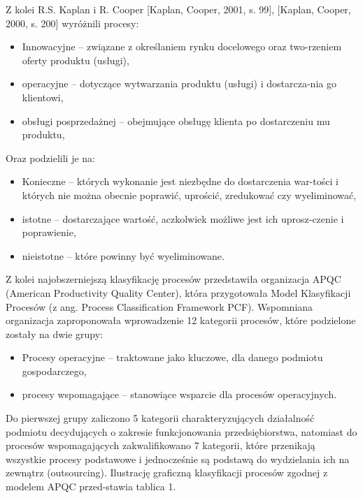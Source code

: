 \documentclass[a4paper, 12pt]{article}
\begin{document}
\hspace*{1.5 cm} Z  kolei  R.S.  Kaplan  i  R.  Cooper  [Kaplan,  Cooper,  2001, s.  99],  [Kaplan, Cooper, 2000, s. 200] wyróżnili procesy:
\begin{itemize}
	\item Innowacyjne – związane z określaniem rynku docelowego oraz two-rzeniem oferty produktu (usługi), 
	\item operacyjne  –  dotyczące  wytwarzania  produktu  (usługi)  i  dostarcza-nia go klientowi,
	\item obsługi posprzedażnej – obejmujące obsługę klienta po dostarczeniu mu produktu,
\end{itemize}
\hspace*{1.5 cm} Oraz podzielili je na:
\begin{itemize}
	\item Konieczne – których wykonanie jest niezbędne do dostarczenia war-tości  i  których  nie  można  obecnie  poprawić,  uprościć,  zredukować czy wyeliminować, 
	\item istotne – dostarczające wartość, aczkolwiek możliwe jest ich uprosz-czenie i poprawienie,
	\item nieistotne – które powinny być wyeliminowane. 
\end{itemize}
\hspace*{1.5 cm} Z kolei najobszerniejszą klasyfikację procesów przedstawiła organizacja APQC (American Productivity Quality Center), która przygotowała Model Klasyfikacji Procesów (z ang. Process Classification Framework PCF). Wspomniana  organizacja  zaproponowała  wprowadzenie  12  kategorii procesów, które podzielone zostały na dwie grupy:
\begin{itemize}
	\item Procesy  operacyjne  –  traktowane  jako  kluczowe,  dla  danego  podmiotu gospodarczego, 
	\item procesy  wspomagające  –  stanowiące  wsparcie  dla  procesów  operacyjnych.
\end{itemize}
\hspace*{1.5 cm} Do  pierwszej  grupy  zaliczono  5  kategorii  charakteryzujących  działalność  podmiotu  decydujących  o  zakresie  funkcjonowania przedsiębiorstwa,  natomiast  do  procesów  wspomagających  zakwalifikowano  7 kategorii,  które  przenikają  wszystkie  procesy  podstawowe  i  jednocześnie są podstawą do wydzielania ich na zewnątrz (outsourcing). Ilustrację  graficzną  klasyfikacji  procesów  zgodnej  z  modelem  APQC  przed-stawia tablica 1.
\end{document}
